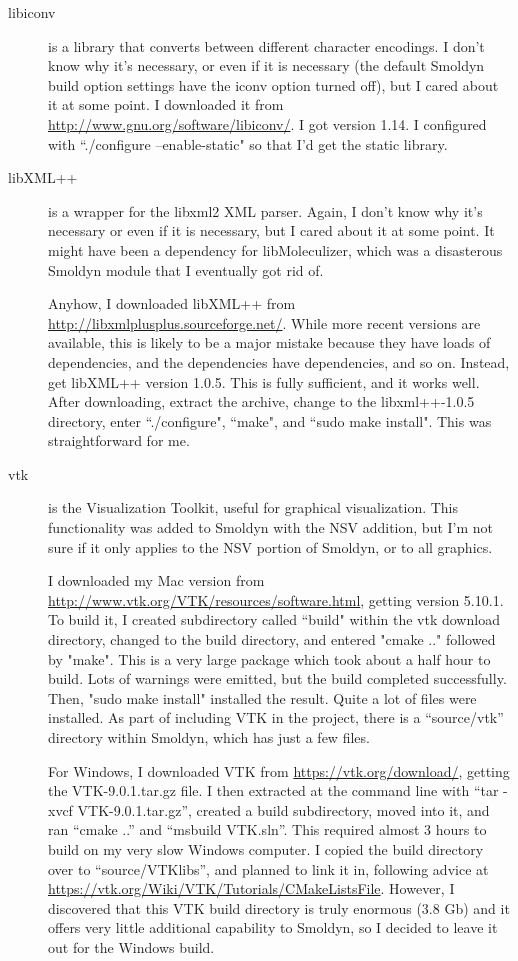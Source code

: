 \documentclass {scrbook}
\begin{document}
\begin{description}
\item[libiconv] is a library that converts between different character encodings. I don't know why it's necessary, or even if it is necessary (the default Smoldyn build option settings have the iconv option turned off), but I cared about it at some point. I downloaded it from \url{http://www.gnu.org/software/libiconv/}. I got version 1.14. I configured with ``./configure --enable-static" so that I'd get the static library.

\item[libXML++] is a wrapper for the libxml2 XML parser. Again, I don't know why it's necessary or even if it is necessary, but I cared about it at some point. It might have been a dependency for libMoleculizer, which was a disasterous Smoldyn module that I eventually got rid of.

Anyhow, I downloaded libXML++ from \url{http://libxmlplusplus.sourceforge.net/}. While more recent versions are available, this is likely to be a major mistake because they have loads of dependencies, and the dependencies have dependencies, and so on. Instead, get libXML++ version 1.0.5. This is fully sufficient, and it works well. After downloading, extract the archive, change to the libxml++-1.0.5 directory, enter ``./configure", ``make", and ``sudo make install". This was straightforward for me.

\item[vtk] is the Visualization Toolkit, useful for graphical visualization. This functionality was added to Smoldyn with the NSV addition, but I'm not sure if it only applies to the NSV portion of Smoldyn, or to all graphics.

I downloaded my Mac version from \url{http://www.vtk.org/VTK/resources/software.html}, getting version 5.10.1. To build it, I created subdirectory called ``build" within the vtk download directory, changed to the build directory, and entered "cmake .." followed by "make". This is a very large package which took about a half hour to build. Lots of warnings were emitted, but the build completed successfully. Then, "sudo make install" installed the result. Quite a lot of files were installed. As part of including VTK in the project, there is a ``source/vtk'' directory within Smoldyn, which has just a few files.

For Windows, I downloaded VTK from \url{https://vtk.org/download/}, getting the VTK-9.0.1.tar.gz file. I then extracted at the command line with ``tar -xvcf VTK-9.0.1.tar.gz'', created a build subdirectory, moved into it, and ran ``cmake ..'' and ``msbuild VTK.sln''. This required almost 3 hours to build on my very slow Windows computer. I copied the build directory over to ``source/VTKlibs'', and planned to link it in, following advice at \url{https://vtk.org/Wiki/VTK/Tutorials/CMakeListsFile}. However, I discovered that this VTK build directory is truly enormous (3.8 Gb) and it offers very little additional capability to Smoldyn, so I decided to leave it out for the Windows build.

\end{description}
\end{document}
